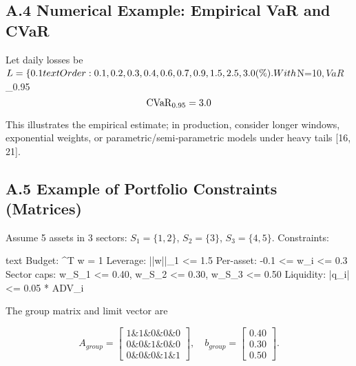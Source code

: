 \documentclass[11pt,a4paper]{article}
\begin{document}
\subsection{A.4 Numerical Example: Empirical VaR and CVaR}

Let daily losses be $L=\{0.1\\%

text
Order: 0.1, 0.2, 0.3, 0.4, 0.6, 0.7, 0.9, 1.5, 2.5, 3.0 (\%).


With $N=10$, VaR$_{0.95}\\%

\begin{equation}
\mathrm{CVaR}_{0.95} = 3.0\\%
\end{equation}

This illustrates the empirical estimate; in production, consider longer windows, exponential weights, or parametric/semi‑parametric models under heavy tails [16, 21].

\subsection{A.5 Example of Portfolio Constraints (Matrices)}

Assume 5 assets in 3 sectors: $S_1=\{1,2\}$, $S_2=\{3\}$, $S_3=\{4,5\}$. Constraints:

text
Budget:        ^T w = 1
Leverage:      ||w||_1 <= 1.5
Per-asset:     -0.1 <= w_i <= 0.3
Sector caps:   w_{S_1} <= 0.40, w_{S_2} <= 0.30, w_{S_3} <= 0.50
Liquidity:     |q_i| <= 0.05 * ADV_i


The group matrix and limit vector are

\begin{equation}
A_{group} = \begin{bmatrix}
1 \& 1 \& 0 \& 0 \& 0\\
0 \& 0 \& 1 \& 0 \& 0\\
0 \& 0 \& 0 \& 1 \& 1
\end{bmatrix},\quad b_{group} = \begin{bmatrix}0.40\\0.30\\0.50\end{bmatrix}.
\end{equation}
\end{document}
